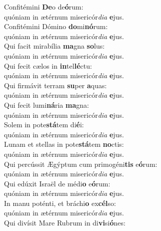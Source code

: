 \evenverse Confitémini \textbf{De}o de\textbf{ó}rum:~\*\\
\evenverse quóniam in ætérnum misericór\textit{di}\textit{a} \textbf{e}jus.\\
\oddverse Confitémini Dómino \textbf{do}mi\textbf{nó}rum:~\*\\
\oddverse quóniam in ætérnum misericór\textit{di}\textit{a} \textbf{e}jus.\\
\evenverse Qui facit mirabília \textbf{ma}gna \textbf{so}lus:~\*\\
\evenverse quóniam in ætérnum misericór\textit{di}\textit{a} \textbf{e}jus.\\
\oddverse Qui fecit cælos in \textbf{in}tel\textbf{lé}ctu:~\*\\
\oddverse quóniam in ætérnum misericór\textit{di}\textit{a} \textbf{e}jus.\\
\evenverse Qui firmávit terram \textbf{su}per \textbf{a}quas:~\*\\
\evenverse quóniam in ætérnum misericór\textit{di}\textit{a} \textbf{e}jus.\\
\oddverse Qui fecit lumi\textbf{ná}ria \textbf{ma}gna:~\*\\
\oddverse quóniam in ætérnum misericór\textit{di}\textit{a} \textbf{e}jus.\\
\evenverse Solem in pote\textbf{stá}tem di\textbf{é}i:~\*\\
\evenverse quóniam in ætérnum misericór\textit{di}\textit{a} \textbf{e}jus.\\
\oddverse Lunam et stellas in pote\textbf{stá}tem \textbf{no}ctis:~\*\\
\oddverse quóniam in ætérnum misericór\textit{di}\textit{a} \textbf{e}jus.\\
\evenverse Qui percússit Ægýptum cum primogéni\textbf{tis} e\textbf{ó}rum:~\*\\
\evenverse quóniam in ætérnum misericór\textit{di}\textit{a} \textbf{e}jus.\\
\oddverse Qui edúxit Israël de médi\textbf{o} e\textbf{ó}rum:~\*\\
\oddverse quóniam in ætérnum misericór\textit{di}\textit{a} \textbf{e}jus.\\
\evenverse In manu poténti, et bráchi\textbf{o} ex\textbf{cél}so:~\*\\
\evenverse quóniam in ætérnum misericór\textit{di}\textit{a} \textbf{e}jus.\\
\oddverse Qui divísit Mare Rubrum in di\textbf{vi}si\textbf{ó}nes:~\*\\
